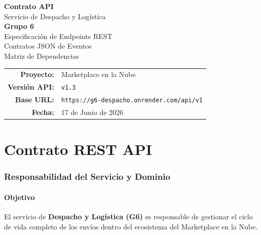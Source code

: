 \documentclass[11pt, a4paper]{article}
\begin{document}
\begin{titlepage}
\centering
\vspace*{2.5cm}

{\Huge\bfseries\textcolor{primary}{Contrato API}}\\[0.3cm]
{\LARGE\textcolor{primary!70}{Servicio de Despacho y Logística}}\\[0.5cm]
{\Large\textcolor{accent}{\textbf{Grupo 6}}}\\[2cm]

{\large Especificación de Endpoints REST}\\[0.2cm]
{\large Contratos JSON de Eventos}\\[0.2cm]
{\large Matriz de Dependencias}\\[3cm]

\begin{tabular}{rl}
  \textbf{Proyecto:}     & Marketplace en la Nube \\
  \textbf{Versión API:}  & \texttt{v1.3} \\
  \textbf{Base URL:}     & \texttt{https://g6-despacho.onrender.com/api/v1} \\
  \textbf{Fecha:}        & 17 de Junio de 2026 \\
\end{tabular}

\vfill



\end{titlepage}

\tableofcontents
\newpage


\part{Contrato REST API}

\section{Responsabilidad del Servicio y Dominio}

\subsection{Objetivo}

El servicio de \textbf{Despacho y Logística (G6)} es responsable de gestionar el ciclo de vida completo de los envíos dentro del ecosistema del Marketplace en la Nube.
\end{document}
